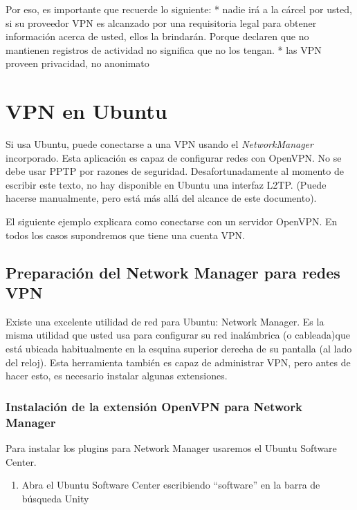 \documentclass[10pt,a5paper,twoside,,]{book}
\providecommand{\tightlist}{%
  \setlength{\itemsep}{0pt}\setlength{\parskip}{0pt}}
\begin{document}
Por eso, es importante que recuerde lo siguiente: * nadie irá a la
cárcel por usted, si su proveedor VPN es alcanzado por una requisitoria
legal para obtener información acerca de usted, ellos la brindarán.
Porque declaren que no mantienen registros de actividad no significa que
no los tengan. * las VPN proveen privacidad, no anonimato

\chapter{VPN en Ubuntu}\label{vpn-en-ubuntu}

Si usa Ubuntu, puede conectarse a una VPN usando el
\emph{NetworkManager} incorporado. Esta aplicación es capaz de
configurar redes con OpenVPN. No se debe usar PPTP por razones de
seguridad. Desafortunadamente al momento de escribir este texto, no hay
disponible en Ubuntu una interfaz L2TP. (Puede hacerse manualmente, pero
está más allá del alcance de este documento).

El siguiente ejemplo explicara como conectarse con un servidor OpenVPN.
En todos los casos supondremos que tiene una cuenta VPN.

\section{Preparación del Network Manager para redes
VPN}\label{preparaciuxf3n-del-network-manager-para-redes-vpn}

Existe una excelente utilidad de red para Ubuntu: Network Manager. Es la
misma utilidad que usted usa para configurar su red inalámbrica (o
cableada)que está ubicada habitualmente en la esquina superior derecha
de su pantalla (al lado del reloj). Esta herramienta también es capaz de
administrar VPN, pero antes de hacer esto, es necesario instalar algunas
extensiones.

\subsection{Instalación de la extensión OpenVPN para Network
Manager}\label{instalaciuxf3n-de-la-extensiuxf3n-openvpn-para-network-manager}

Para instalar los plugins para Network Manager usaremos el Ubuntu
Software Center.

\begin{enumerate}
\def\labelenumi{\arabic{enumi}.}
\tightlist
\item
  Abra el Ubuntu Software Center escribiendo ``software'' en la barra de
  búsqueda Unity
\end{enumerate}
\end{document}
